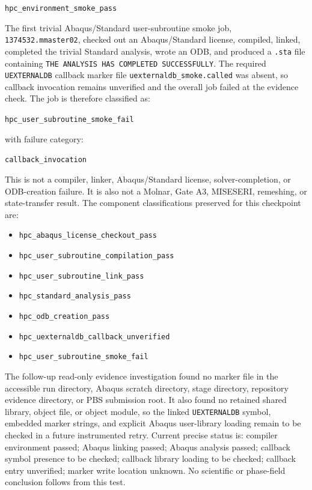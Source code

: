 \documentclass[11pt,a4paper]{article}
\begin{document}
\begin{center}
\texttt{hpc\_environment\_smoke\_pass}
\end{center}

The first trivial Abaqus/Standard user-subroutine smoke job, \texttt{1374532.mmaster02}, checked out an Abaqus/Standard license, compiled, linked, completed the trivial Standard analysis, wrote an ODB, and produced a \texttt{.sta} file containing \texttt{THE ANALYSIS HAS COMPLETED SUCCESSFULLY}. The required \texttt{UEXTERNALDB} callback marker file \texttt{uexternaldb\_smoke.called} was absent, so callback invocation remains unverified and the overall job failed at the evidence check. The job is therefore classified as:

\begin{center}
\texttt{hpc\_user\_subroutine\_smoke\_fail}
\end{center}

with failure category:

\begin{center}
\texttt{callback\_invocation}
\end{center}

This is not a compiler, linker, Abaqus/Standard license, solver-completion, or ODB-creation failure. It is also not a Molnar, Gate A3, MISESERI, remeshing, or state-transfer result. The component classifications preserved for this checkpoint are:

\begin{itemize}
  \item \texttt{hpc\_abaqus\_license\_checkout\_pass}
  \item \texttt{hpc\_user\_subroutine\_compilation\_pass}
  \item \texttt{hpc\_user\_subroutine\_link\_pass}
  \item \texttt{hpc\_standard\_analysis\_pass}
  \item \texttt{hpc\_odb\_creation\_pass}
  \item \texttt{hpc\_uexternaldb\_callback\_unverified}
  \item \texttt{hpc\_user\_subroutine\_smoke\_fail}
\end{itemize}

The follow-up read-only evidence investigation found no marker file in the accessible run directory, Abaqus scratch directory, stage directory, repository evidence directory, or PBS submission root. It also found no retained shared library, object file, or object module, so the linked \texttt{UEXTERNALDB} symbol, embedded marker strings, and explicit Abaqus user-library loading remain to be checked in a future instrumented retry. Current precise status is: compiler environment passed; Abaqus linking passed; Abaqus analysis passed; callback symbol presence to be checked; callback library loading to be checked; callback entry unverified; marker write location unknown. No scientific or phase-field conclusion follows from this test.
\end{document}
